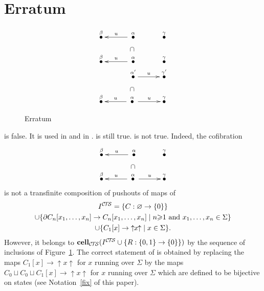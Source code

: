\documentclass[a4paper,12pt]{amsart}
\begin{document}
\appendix

\section{Erratum}

\begin{figure}
\[
\xymatrix@C=3em@R=0.2em
{
\stackrel{\beta}\bullet & {\ar@{->}[l]_-{{u}}} \stackrel{\alpha}\bullet & \stackrel{\gamma}\bullet \\
& \cap & \\
\stackrel{\beta}\bullet & {\ar@{->}[l]_-{{u}}} \stackrel{\alpha}\bullet & \stackrel{\gamma}\bullet \\
 & {\ar@{->}[r]^-{{u}}} \stackrel{\alpha'}\bullet & \stackrel{\gamma'}\bullet \\
& \cap & \\
\stackrel{\beta}\bullet & {\ar@{->}[l]_-{{u}}} \stackrel{\alpha}\bullet {\ar@{->}[r]^-{{u}}} &\stackrel{\gamma}\bullet
}
\]
\caption{Erratum}
\label{inclusions}
\end{figure}

\cite[Theorem~A.2]{biscsts1} is false. It is used in
\cite[Proposition~2.7]{biscsts1} and in \cite[Theorem~3.7]{biscsts1}.
\cite[Proposition~2.7]{biscsts1} is still true.
\cite[Theorem~3.7]{biscsts1} is not true. Indeed, 
the cofibration 
\[
\xymatrix@C=3em@R=0.2em
{
\stackrel{\beta}\bullet & {\ar@{->}[l]_-{{u}}} \stackrel{\alpha}\bullet & \stackrel{\gamma}\bullet \\
& \cap & \\
\stackrel{\beta}\bullet & {\ar@{->}[l]_-{{u}}} \stackrel{\alpha}\bullet {\ar@{->}[r]^-{{u}}} & \stackrel{\gamma}\bullet
}
\]
is not a transfinite composition of pushouts of maps of 
\begin{multline*}
I^{\mathcal{C\!T\!S}} = \{C:\varnothing \to \{0\}\} \\ \cup \{{\partial} C_n[x_1,\dots,x_n]
\to C_n[x_1,\dots,x_n]\mid \hbox{$n{\geqslant} 1$ and $x_1,\dots,x_n \in
  \Sigma$}\} \\ \cup \{C_1[x] \to {\uparrow\!\!{{x}}\!\!\uparrow}\mid x\in \Sigma\}.
\end{multline*}
However, it belongs to $\operatorname{{{\rm{\mathbf{{cell}}}}}}_{\mathcal{C\!T\!S}}(I^{\mathcal{C\!T\!S}} \cup \{R:\{0,1\} \to
\{0\}\})$ by the sequence of inclusions of Figure~\ref{inclusions}. The
correct statement of \cite[Theorem~3.7]{biscsts1} is obtained by
replacing the maps $C_1[x]\to {\uparrow\!\!{{x}}\!\!\uparrow}$ for $x$ running over $\Sigma$ by
the maps $C_0 \sqcup C_0 \sqcup C_1[x] \to {\uparrow\!\!{{x}}\!\!\uparrow}$ for $x$ running
over $\Sigma$ which are defined to be bijective on states (see
Notation~\ref{fix} of this paper).
\end{document}
